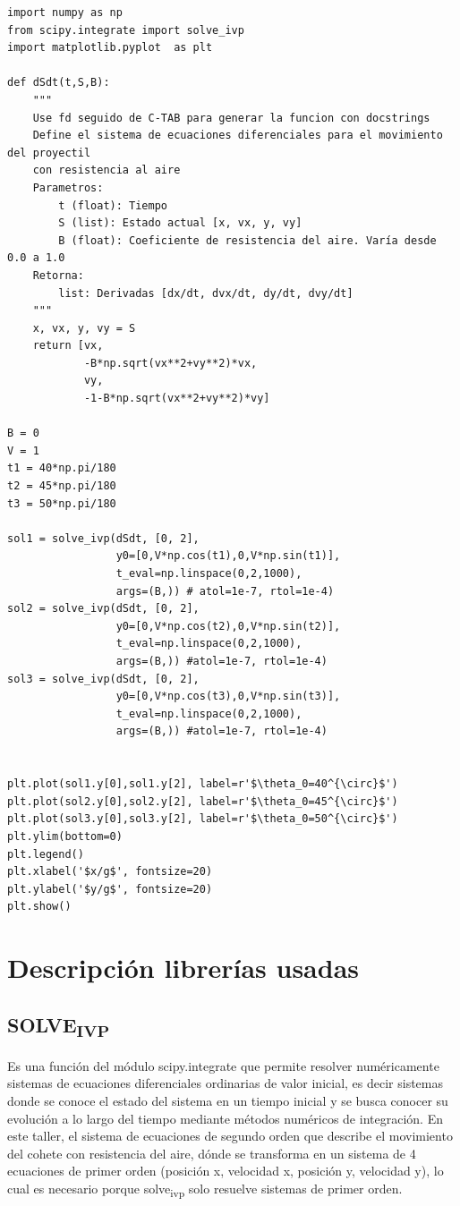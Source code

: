 \documentclass{article}
\begin{document}
\begin{verbatim}
import numpy as np
from scipy.integrate import solve_ivp
import matplotlib.pyplot  as plt

def dSdt(t,S,B):
    """
    Use fd seguido de C-TAB para generar la funcion con docstrings
    Define el sistema de ecuaciones diferenciales para el movimiento del proyectil
    con resistencia al aire
    Parametros:
        t (float): Tiempo
        S (list): Estado actual [x, vx, y, vy]
        B (float): Coeficiente de resistencia del aire. Varía desde 0.0 a 1.0
    Retorna:
        list: Derivadas [dx/dt, dvx/dt, dy/dt, dvy/dt]
    """
    x, vx, y, vy = S
    return [vx,
            -B*np.sqrt(vx**2+vy**2)*vx,
            vy,
            -1-B*np.sqrt(vx**2+vy**2)*vy]

B = 0
V = 1
t1 = 40*np.pi/180
t2 = 45*np.pi/180
t3 = 50*np.pi/180

sol1 = solve_ivp(dSdt, [0, 2],
                 y0=[0,V*np.cos(t1),0,V*np.sin(t1)],
                 t_eval=np.linspace(0,2,1000),
                 args=(B,)) # atol=1e-7, rtol=1e-4)
sol2 = solve_ivp(dSdt, [0, 2],
                 y0=[0,V*np.cos(t2),0,V*np.sin(t2)],
                 t_eval=np.linspace(0,2,1000),
                 args=(B,)) #atol=1e-7, rtol=1e-4)
sol3 = solve_ivp(dSdt, [0, 2],
                 y0=[0,V*np.cos(t3),0,V*np.sin(t3)],
                 t_eval=np.linspace(0,2,1000),
                 args=(B,)) #atol=1e-7, rtol=1e-4)


plt.plot(sol1.y[0],sol1.y[2], label=r'$\theta_0=40^{\circ}$')
plt.plot(sol2.y[0],sol2.y[2], label=r'$\theta_0=45^{\circ}$')
plt.plot(sol3.y[0],sol3.y[2], label=r'$\theta_0=50^{\circ}$')
plt.ylim(bottom=0)
plt.legend()
plt.xlabel('$x/g$', fontsize=20)
plt.ylabel('$y/g$', fontsize=20)
plt.show()

\end{verbatim}
\section{Descripción librerías usadas}
\label{sec:org2949d6c}
\subsection{SOLVE\textsubscript{IVP}}
\label{sec:org37a8b7a}
Es una función del módulo scipy.integrate que permite resolver numéricamente sistemas de ecuaciones diferenciales ordinarias de valor inicial, es decir sistemas donde se conoce el estado del sistema
en un tiempo inicial y se busca conocer su evolución a lo largo del tiempo mediante métodos numéricos de integración.
En este taller, el sistema de ecuaciones de segundo orden que describe el movimiento del cohete con resistencia del aire, dónde se transforma en un sistema de 4 ecuaciones de primer orden
(posición x, velocidad x, posición y, velocidad y), lo cual es necesario porque solve\textsubscript{ivp} solo resuelve sistemas de primer orden.
\end{document}
